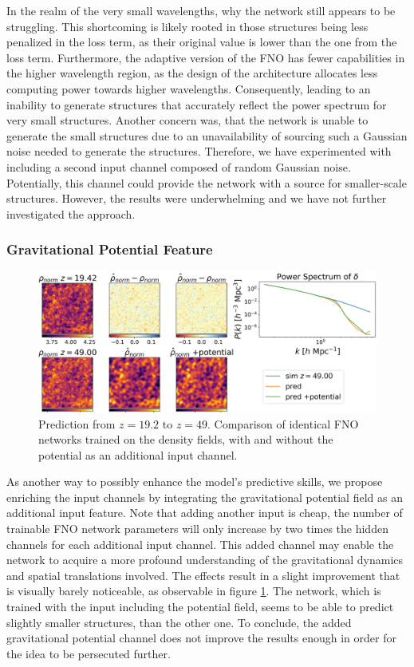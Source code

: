 \documentclass{article}
\begin{document}
In the realm of the very small wavelengths, why the network still appears to be struggling. This shortcoming is likely rooted in those structures being less penalized in the loss term, as their original value is lower than the one from the loss term. Furthermore, the adaptive version of the FNO has fewer capabilities in the higher wavelength region, as the design of the architecture allocates less computing power towards higher wavelengths. Consequently, leading to an inability to generate structures that accurately reflect the power spectrum for very small structures. Another concern was, that the network is unable to generate the small structures due to an unavailability of sourcing such a Gaussian noise needed to generate the structures. Therefore, we have experimented with including a second  input channel composed of random Gaussian noise. Potentially, this channel could provide the network with a source for smaller-scale structures. However, the results were underwhelming and we have not further investigated the approach.


\subsubsection{Gravitational Potential Feature}

\begin{figure}[h]
    \centering
    \includegraphics[width=0.95\linewidth]{img/compare_potential_4.png}
    \caption{Prediction from $z=19.2$ to $z=49$. Comparison of identical FNO networks trained on the density fields, with and without the potential as an additional input channel.}
    \label{fig:potential}
\end{figure}

As another way to possibly enhance the model's predictive skills, we propose enriching the input channels by integrating the gravitational potential field as an additional input feature. Note that adding another input is cheap, the number of trainable FNO network parameters will only increase by two times the hidden channels for each additional input channel. This added channel may enable the network to acquire a more profound understanding of the gravitational dynamics and spatial translations involved. The effects result in a slight improvement that is visually barely noticeable, as observable in figure \ref{fig:potential}. The network, which is trained with the input including the potential field, seems to be able to predict slightly smaller structures, than the other one. To conclude, the added gravitational potential channel does not improve the results enough in order for the idea to be persecuted further.
\end{document}

